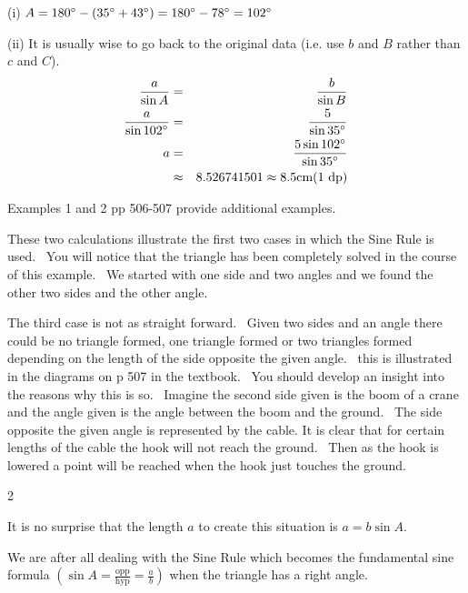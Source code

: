 (i) $A =180 \mbox{{\ensuremath{{}^\circ}}} -(35 \mbox{{\ensuremath{{}^\circ}}} +43 \mbox{{\ensuremath{{}^\circ}}}) =180 \mbox{{\ensuremath{{}^\circ}}} -78 \mbox{{\ensuremath{{}^\circ}}} =102 \mbox{{\ensuremath{{}^\circ}}}$ 

(ii) It is usually wise to go back to the original data (i.e. use $b$ and $B$ rather than $c$ and $C$).
\begin{align*}\frac{a}{\sin  A} &  = & \frac{b}{\sin  B} \\
\frac{a}{\sin  102 \mbox{{\ensuremath{{}^\circ}}}} &  = & \frac{5}{\sin  35 \mbox{{\ensuremath{{}^\circ}}}} \\
a &  = & \frac{5 \sin  102 \mbox{{\ensuremath{{}^\circ}}}}{\sin  35 \mbox{{\ensuremath{{}^\circ}}}} \\
 &  \approx  & 8.526741501 \approx 8.5 \mbox{cm}\text{(1 dp)}\end{align*}

Examples 1 and 2 pp 506-507 provide additional examples. 

These two calculations
illustrate the first two cases in which the Sine Rule is used. \ You will notice that the triangle has been completely
solved in the course of this example. \ We started with one side and two angles and we found the other two sides
and the other angle. 

The third case is not as straight forward. \ Given two sides and an
angle there could be no triangle formed, one triangle formed or two triangles formed depending on the length of the side opposite the given angle. \ this
is illustrated in the diagrams on p 507 in the textbook. \ You should develop an insight into the reasons why
this is so. \ Imagine the second side given is the boom of a crane and the angle given is the angle between the
boom and the ground. \ The side opposite the given angle is represented by the cable. It is clear that for certain
lengths of the cable the hook will not reach the ground. \ Then as the hook is lowered a point will be reached
when the hook just touches the ground.  
\columnsep =30pt
\begin {multicols}{2}
 

   
\setlength\fboxrule{0in}\setlength\fboxsep{0.2in}


It is no surprise that the length $a$ to create this situation is $a =b \sin  A\text{.}$ 

We are after all dealing with the Sine Rule which becomes the fundamental sine formula $\left (\sin  A =\frac{\text{opp}}{\text{hyp}} =\frac{a}{b}\right )$ when the triangle has a right angle. 
\end {multicols}


